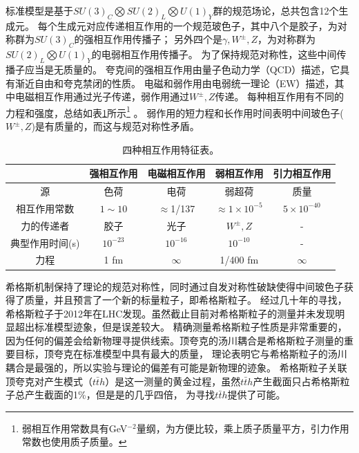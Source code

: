 标准模型是基于$SU(3)_C\bigotimes SU(2)_L\bigotimes U(1)_Y$群的规范场论，总共包含12个生成元。
每个生成元对应传递相互作用的一个规范玻色子，其中八个是胶子，为对称群为$SU(3)_C$的强相互作用传播子；
另外四个是$\gamma, W^{\pm}, Z$，为对称群为$SU(2)_L\bigotimes U(1)_Y$的电弱相互作用传播子。
为了保持规范对称性，这些中间传播子应当是无质量的。
夸克间的强相互作用由量子色动力学（QCD）描述，它具有渐近自由和夸克禁闭的性质。
电磁和弱作用由电弱统一理论（EW）描述，其中电磁相互作用通过光子传递，弱作用通过$W^{\pm}, Z$传递。
每种相互作用有不同的力程和强度，总结如表\ref{tab:summary_interactions}所示\footnote{弱相互作用常数具有GeV$^{-2}$量纲，为方便比较，乘上质子质量平方，引力作用常数也使用质子质量。} 。
弱作用的短力程和长作用时间表明中间玻色子($W^{\pm}, Z$)是有质量的，而这与规范对称性矛盾。
\begin{table}[h]
\centering
\begin{tabular}{c|c|c|c|c}
\hline
     		&强相互作用   &电磁相互作用  &弱相互作用 &引力相互作用 \\
\hline
源		&色荷  &电荷   &弱超荷   &质量 \\
相互作用常数 &$1\sim 10$  &$\approx$1/137   &$\approx 1\times 10^{-5}$    &$5\times 10^{-40}$ \\
力的传递者 &胶子  &光子  &$W^{\pm}, Z$  &- \\
典型作用时间(s) &$10^{-23}$  &$10^{-16}$  &$10^{-10}$   &- \\
力程  &1 fm  &$\infty$   &1/400 fm  &$\infty$  \\
\hline
\end{tabular}
\caption{四种相互作用特征表。}
\label{tab:summary_interactions}
\end{table}

希格斯机制\cite{PhysRevLett.13.321,HIGGS1964132,PhysRevLett.13.508,PhysRevLett.13.585,PhysRev.145.1156,PhysRev.155.1554}保持了理论的规范对称性，同时通过自发对称性破缺使得中间玻色子获得了质量，并且预言了一个新的标量粒子，即希格斯粒子。
经过几十年的寻找，希格斯粒子于2012年在LHC发现\cite{Aad:2012tfa,Chatrchyan:2012xdj}。虽然截止目前对希格斯粒子的测量并未发现明显超出标准模型迹象，但是误差较大。
精确测量希格斯粒子性质是非常重要的，因为任何的偏差会给新物理寻提供线索。顶夸克的汤川耦合是希格斯粒子测量的重要目标，顶夸克在标准模型中具有最大的质量，
理论表明它与希格斯粒子的汤川耦合是最强的，所以实验与理论的偏差有可能是新物理的迹象。
希格斯粒子关联顶夸克对产生模式（$t\bar{t}h$）是这一测量的黄金过程，虽然$t\bar{t}h$产生截面只占希格斯粒子总产生截面的1\%，但是\RunTwo 是\RunOne 的几乎四倍，
为寻找$t\bar{t}h$提供了可能。

